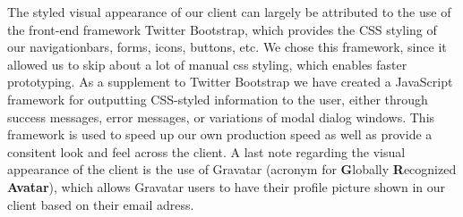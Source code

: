 The styled visual appearance of our client can largely be attributed to the use of the front-end framework Twitter Bootstrap, which provides the CSS styling of our navigationbars, forms, icons, buttons, etc. We chose this framework, since it allowed us to skip about a lot of manual css styling, which enables faster prototyping. As a supplement to Twitter Bootstrap we have created a JavaScript framework for outputting CSS-styled information to the user, either through success messages, error messages, or variations of modal dialog windows. This framework is used to speed up our own production speed as well as provide a consitent look and feel across the client.
A last note regarding the visual appearance of the client is the use of Gravatar (acronym for \textbf{G}lobally \textbf{R}ecognized \textbf{Avatar}), which allows Gravatar users to have their profile picture shown in our client based on their email adress.

